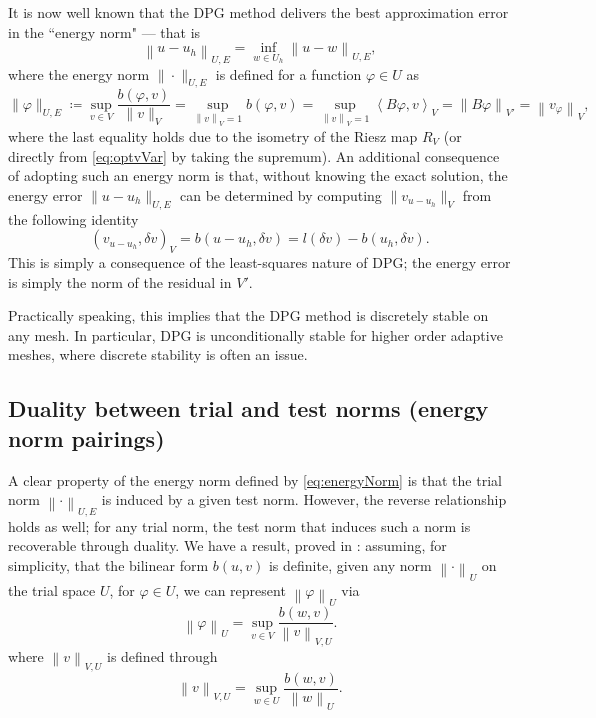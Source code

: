 \documentclass[11pt,onecolumn]{scrartcl}
\newcommand{\eqnlab}[1]{\label{eq:#1}}
\newcommand{\eqnref}[1]{\eqref{eq:#1}}
\newcommand{\seclab}[1]{\label{sec:#1}}
\newcommand{\nor}[1]{\left\| #1 \right\|}
\newcommand{\LRp}[1]{\left( #1 \right)}
\newcommand{\LRa}[1]{\left\langle #1 \right\rangle}
\begin{document}
It is now well known that the DPG method
delivers the best approximation error in the ``energy norm" --- that is
\cite{Bui-ThanhDemkowiczGhattas11a, DPG2,DPG4} 
\begin{equation}
\eqnlab{optimalError}
\nor{u-u_h}_{U,E} = \inf_{w\in U_h} \nor{u-w}_{U,E},
\end{equation}
where the energy norm $\|\cdot \|_{U,E}$ is defined for a function $\varphi \in U$ as
\begin{equation}
\eqnlab{energyNorm} \|\varphi\|_{U,E} \coloneqq \sup_{v\in V}
\frac{b(\varphi,v)}{\|v\|_V} = \sup_{\nor{v}_V = 1} b(\varphi,v) =
\sup_{\nor{v}_V = 1} \LRa{B\varphi,v}_V = \nor{B\varphi}_{V'} =
\nor{v_\varphi}_V,
\end{equation}
where the last equality holds due to the isometry of the Riesz map
$R_V$ (or directly from \eqnref{optvVar} by taking the supremum). An
additional consequence of adopting such an energy norm is that,
without knowing the exact solution, the energy error $\|u-u_h\|_{U,E}$ can
be determined by computing $\|v_{u-u_h}\|_V$ from the following
identity
\[
\left(v_{u-u_h},\delta v\right)_V = b(u-u_h,\delta v) = l\LRp{\delta
v} - b(u_h,\delta v).
\]
This is simply a consequence of the least-squares nature of DPG; the energy error is simply the norm of the  residual in $V'$. 

Practically speaking, this implies that the DPG method is discretely stable on any mesh. In particular, DPG is unconditionally stable for higher order adaptive meshes, where discrete stability is often an issue. 

\subsection{Duality between trial and test norms (energy norm pairings)}
\seclab{energyPair}
A clear property of the energy norm defined by \eqnref{energyNorm} is that the trial norm $\nor{\cdot}_{U,E}$ is induced by a given test norm. However, the reverse relationship holds as well; for any trial norm, the test norm that induces such a norm is recoverable through duality. We have a result, proved in \cite{Bui-ThanhDemkowiczGhattas11a}: assuming, for simplicity, that the bilinear form $b(u,v)$ is definite, given any norm $\nor{\cdot}_{U}$ on the trial space $U$, for $\varphi \in U$, we can represent $\nor{\varphi}_{U}$ via
\[
\nor{\varphi}_{U} = \sup_{v \in V}\frac{b\LRp{w,v}}{\nor{v}_{V,U}}.
\]
where $\nor{v}_{V,U}$ is defined through
\[
\nor{v}_{V,U} = \sup_{w \in U}\frac{b\LRp{w,v}}{\nor{w}_{U}}.
\]
\end{document}
